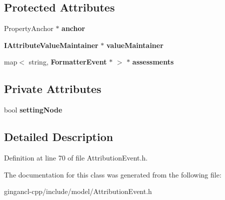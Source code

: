\subsection*{Protected Attributes}
\begin{CompactItemize}
\item 
PropertyAnchor $\ast$ {\bf anchor}\label{classbr_1_1pucrio_1_1telemidia_1_1ginga_1_1ncl_1_1model_1_1event_1_1AttributionEvent_6f0567b2f33e1087f27d80048f7b21e9}

\item 
{\bf IAttributeValueMaintainer} $\ast$ {\bf valueMaintainer}\label{classbr_1_1pucrio_1_1telemidia_1_1ginga_1_1ncl_1_1model_1_1event_1_1AttributionEvent_7c860c0e0009f37c7ca7b878a805d07a}

\item 
map$<$ string, {\bf FormatterEvent} $\ast$ $>$ $\ast$ {\bf assessments}\label{classbr_1_1pucrio_1_1telemidia_1_1ginga_1_1ncl_1_1model_1_1event_1_1AttributionEvent_9e96a106a67c89e9d4b80a9fa8cb200b}

\end{CompactItemize}
\subsection*{Private Attributes}
\begin{CompactItemize}
\item 
bool {\bf settingNode}\label{classbr_1_1pucrio_1_1telemidia_1_1ginga_1_1ncl_1_1model_1_1event_1_1AttributionEvent_bf86372988d5dd964a7ec168fb10b34c}

\end{CompactItemize}


\subsection{Detailed Description}




Definition at line 70 of file AttributionEvent.h.

The documentation for this class was generated from the following file:\begin{CompactItemize}
\item 
gingancl-cpp/include/model/AttributionEvent.h\end{CompactItemize}
